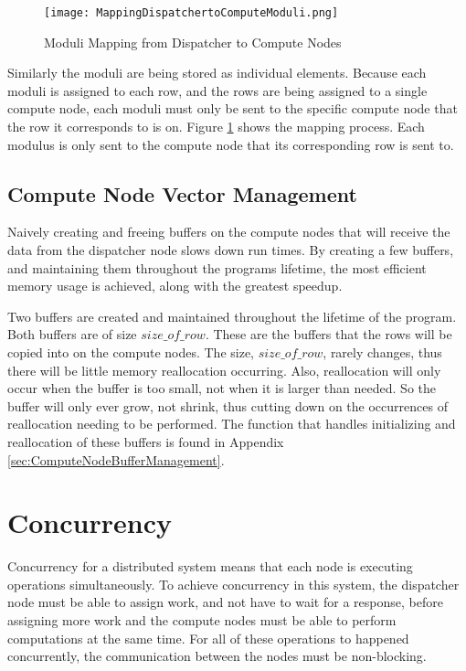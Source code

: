 \begin{figure}[htp]
\centering
\texttt{[image: MappingDispatchertoComputeModuli.png]}
\caption{Moduli Mapping from Dispatcher to Compute Nodes}
\label{fig:MappingDispatcherToComputeModuli}
\end{figure}
Similarly the moduli are being stored as individual elements. Because each moduli is assigned to each row, and the rows are being assigned to a single compute node, each moduli must only be sent to the specific compute node that the row it corresponds to is on. Figure \ref{fig:MappingDispatcherToComputeModuli} shows the mapping process. Each modulus is only sent to the compute node that its corresponding row is sent to.

\subsection{Compute Node Vector Management}
Naively creating and freeing buffers on the compute nodes that will receive the data from the dispatcher node slows down run times. By creating a few buffers, and maintaining them throughout the programs lifetime, the most efficient memory usage is achieved, along with the greatest speedup.

Two buffers are created and maintained throughout the lifetime of the program. Both buffers are of size $size\_of\_row$. These are the buffers that the rows will be copied into on the compute nodes. The size, $size\_of\_row$, rarely changes, thus there will be little memory reallocation occurring. Also, reallocation will only occur when the buffer is too small, not when it is larger than needed. So the buffer will only ever grow, not shrink, thus cutting down on the occurrences of reallocation needing to be performed. The function that handles initializing and reallocation of these buffers is found in Appendix \ref{sec:ComputeNodeBufferManagement}.

\section{Concurrency} \label{sec:Concurrency}
Concurrency for a distributed system means that each node is executing operations simultaneously. To achieve concurrency in this system, the dispatcher node must be able to assign work, and not have to wait for a response, before assigning more work and the compute nodes must be able to perform computations at the same time. For all of these operations to happened concurrently, the communication between the nodes must be non-blocking.

